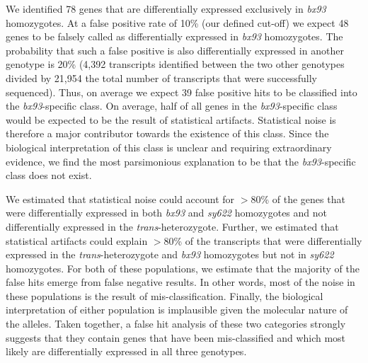 \documentclass[10pt, twocolumn]{article}
\begin{document}
We identified 78 genes that are differentially expressed exclusively in
\emph{bx93} homozygotes. At a false positive rate of 10\% (our defined cut-off)
we expect 48 genes to be falsely called as differentially expressed in
\emph{bx93} homozygotes. The probability that such a false positive is also
differentially expressed in another genotype is 20\% (4,392 transcripts
identified between the two other genotypes divided by 21,954 the total number of
transcripts that were successfully sequenced). Thus, on average we expect 39
false positive hits to be classified into the \emph{bx93}-specific class. On
average, half of all genes in the \emph{bx93}-specific class would be expected
to be the result of statistical artifacts. Statistical noise is therefore a
major contributor towards the existence of this class. Since the biological
interpretation of this class is unclear and requiring extraordinary evidence, we
find the most parsimonious explanation to be that the \emph{bx93}-specific class
does not exist.

We estimated that statistical noise could account for $>80$\% of the genes that
were differentially expressed in both \emph{bx93} and \emph{sy622} homozygotes
and not differentially expressed in the \emph{trans}-heterozygote. Further, we
estimated that statistical artifacts could explain $>80$\% of the transcripts
that were differentially expressed in the \emph{trans}-heterozygote and
\emph{bx93} homozygotes but not in \emph{sy622} homozygotes. For both of these
populations, we estimate that the majority of the false hits emerge from false
negative results. In other words, most of the noise in these populations is the
result of mis-classification. Finally, the biological interpretation of either
population is implausible given the molecular nature of the alleles. Taken
together, a false hit analysis of these two categories strongly suggests that
they contain genes that have been mis-classified and which most likely are
differentially expressed in all three genotypes.
\end{document}
